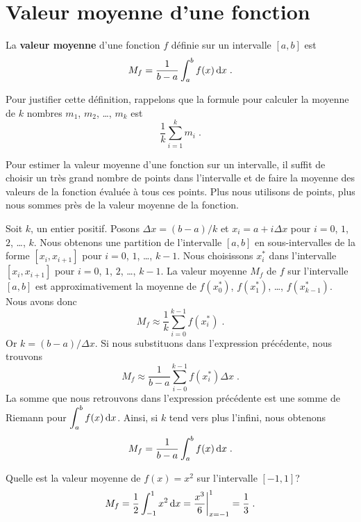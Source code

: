 {

\section{Valeur moyenne d'une fonction }

\begin{focus}{\dfn} 
La {\bfseries valeur moyenne} d'une fonction $f$ définie sur un intervalle
$[a,b]$ est
\[
M_f = \frac{1}{b-a} \int_a^b f(x)\,\mathrm{d}x \; .
\]
\end{focus}

Pour justifier cette définition, rappelons que la formule pour calculer la
moyenne de $k$ nombres $m_1$, $m_2$, \ldots, $m_k$ est
\[
\frac{1}{k} \sum_{i=1}^k m_i \; .
\]

Pour estimer la valeur moyenne d'une fonction sur un intervalle, il suffit de
choisir un très grand nombre de points dans l'intervalle et de faire la
moyenne des valeurs de la fonction évaluée à tous ces points.  Plus nous
utilisons de points, plus nous sommes près de la valeur moyenne de la fonction.

Soit $k$, un entier positif.  Posons $\Delta x = (b-a)/k$ et
$x_i = a + i \Delta x$ pour $i=0$, $1$, $2$, \ldots, $k$.  Nous obtenons une
partition de l'intervalle $[a,b]$ en sous-intervalles de la forme
$[x_i,x_{i+1}]$ pour $i=0$, $1$, \ldots, $k-1$.  Nous choisissons $x_i^\ast$
dans l'intervalle $[x_i,x_{i+1}]$ pour $i=0$, $1$, $2$, \ldots, $k-1$.  La
valeur moyenne $M_f$ de $f$ sur l'intervalle $[a,b]$ est approximativement la
moyenne de $f(x_0^\ast)$, $f(x_1^\ast)$, \ldots, $f(x_{k-1}^\ast)$.
Nous avons donc
\[
M_f \approx \frac{1}{k} \sum_{i=0}^{k-1} f(x_i^\ast) \; .
\]
Or $k = (b-a)/\Delta x$.  Si nous substituons dans l'expression
précédente, nous trouvons
\[
M_f \approx \frac{1}{b-a} \sum_{i-0}^{k-1} f(x_i^\ast) \Delta x \; .
\]
La somme que nous retrouvons dans l'expression précédente est une somme de
Riemann pour $\displaystyle \int_a^b f(x) \,\mathrm{d}x$.  Ainsi, si $k$ tend vers
plus l'infini, nous obtenons
\[
M_f = \frac{1}{b-a} \int_a^b f(x) \,\mathrm{d}x \; .
\]

\begin{egg}
Quelle est la valeur moyenne de $f(x)=x^2$ sur l'intervalle $[-1,1]$?
\[
M_f = \frac{1}{2} \int_{-1}^1 x^2 \,\mathrm{d}x =
\frac{x^3}{6}\bigg|_{x=-1}^1 = \frac{1}{3} \; .
\]
\end{egg}

}

